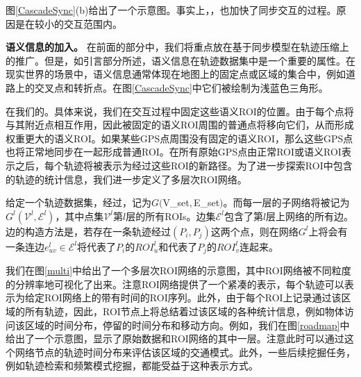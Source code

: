 图\ref{CascadeSync}(b)给出了一个示意图。事实上，，也加快了同步交互的过程。原因是在较小的交互范围内。




\noindent\textbf{语义信息的加入。}
在前面的部分中，我们将重点放在基于同步模型在轨迹压缩上的推广。但是，如引言部分所述，语义信息在轨迹数据集中是一个重要的属性。在现实世界的场景中，语义信息通常体现在地图上的固定点或区域的集合中，例如道路上的交叉点和转折点。在图\ref{CascadeSync}中它们被绘制为浅蓝色三角形。

在我们的。具体来说，我们在交互过程中固定这些语义ROI的位置。由于每个点将与其附近点相互作用，因此被固定的语义ROI周围的普通点将移向它们，从而形成权重更大的语义ROI。如果某些GPS点周围没有固定的语义ROI，那么这些GPS点也将正常地同步在一起形成普通ROI。在所有原始GPS点由正常ROI或语义ROI表示之后，每个轨迹将被表示为经过这些ROI的新路径。为了进一步探索ROI中包含的轨迹的统计信息，我们进一步定义了多层次ROI网络。


\begin{dingyi}[多层次ROI网络]
给定一个轨迹数据集，经过，记为$G($\gls{V_set}$,$\gls{E_set}$)$。而每一层的子网络将被记为$G^l(\mathcal{V}^l,\mathcal{E}^l)$，其中点集$\mathcal{V}^l$第$l$层的所有ROIs。边集$\mathcal{E}^l$包含了第$l$层上网络的所有边。边的构造方法是，若存在一条轨迹经过$(P_{i}, P_{j})$这两个点，则在网络$G^l$上将会有一条连边$e^l_{uv}\in \mathcal{E}^l$将代表了$P_i$的${ROI}^l_u$和代表了$P_j$的${ROI}^l_v$连起来。
\end{dingyi}



我们在图\ref{multi}中给出了一个多层次ROI网络的示意图，其中ROI网络被不同粒度的分辨率地可视化了出来。注意ROI网络提供了一个紧凑的表示，每个轨迹可以表示为给定ROI网络上的带有时间的ROI序列。此外，由于每个ROI上记录通过该区域的所有轨迹，因此，ROI节点上将总结着过该区域的各种统计信息，例如物体访问该区域的时间分布，停留的时间分布和移动方向。例如，我们在图\ref{roadmap}中给出了一个示意图，显示了原始数据和ROI网络的其中一层。注意此时可以通过这个网络节点的轨迹时间分布来评估该区域的交通模式。此外，一些后续挖掘任务，例如轨迹检索和频繁模式挖掘，都能受益于这种表示方式。


